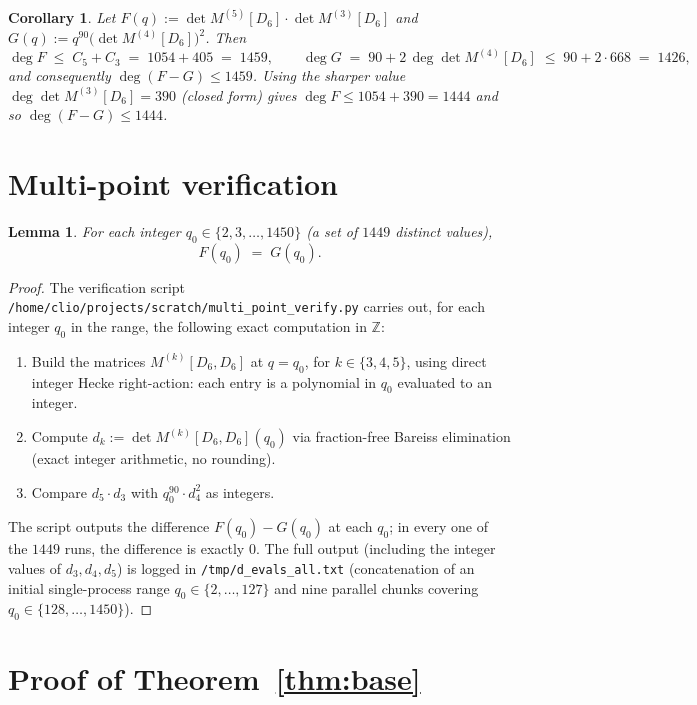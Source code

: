 \documentclass[11pt]{article}
\newtheorem{lemma}[theorem]{Lemma}
\newtheorem{corollary}[theorem]{Corollary}
\theoremstyle{definition}
\begin{document}
\begin{corollary}\label{cor:deg-FG}
Let $F(q):=\det M^{(5)}[D_6]\cdot\det M^{(3)}[D_6]$ and
$G(q):=q^{90}\bigl(\det M^{(4)}[D_6]\bigr)^2$. Then
\[
\deg F \;\leq\; C_5 + C_3 \;=\; 1054 + 405 \;=\; 1459,
\qquad
\deg G \;=\; 90 + 2\,\deg\det M^{(4)}[D_6] \;\leq\; 90 + 2\cdot 668 \;=\; 1426,
\]
and consequently $\deg(F-G)\leq 1459$.
Using the sharper value $\deg\det M^{(3)}[D_6]=390$ (closed form) gives
$\deg F\leq 1054+390=1444$ and so $\deg(F-G)\leq 1444$.
\end{corollary}

\section{Multi-point verification}

\begin{lemma}\label{lem:multi-point}
For each integer $q_0\in\{2,3,\ldots,1450\}$ (a set of $1449$ distinct values),
\[
F(q_0)\;=\;G(q_0).
\]
\end{lemma}

\begin{proof}
The verification script
\texttt{/home/clio/projects/scratch/multi\_point\_verify.py} carries out, for
each integer $q_0$ in the range, the following exact computation in
$\mathbb{Z}$:
\begin{enumerate}
\item Build the matrices $M^{(k)}[D_6, D_6]$ at $q=q_0$, for $k\in\{3,4,5\}$,
using direct integer Hecke right-action: each entry is a polynomial in $q_0$
evaluated to an integer.
\item Compute $d_k:=\det M^{(k)}[D_6, D_6](q_0)$ via fraction-free Bareiss
elimination (exact integer arithmetic, no rounding).
\item Compare $d_5\cdot d_3$ with $q_0^{90}\cdot d_4^2$ as integers.
\end{enumerate}
The script outputs the difference $F(q_0)-G(q_0)$ at each $q_0$; in every one
of the $1449$ runs, the difference is exactly $0$. The full output (including
the integer values of $d_3,d_4,d_5$) is logged in
\texttt{/tmp/d\_evals\_all.txt} (concatenation of an initial single-process
range $q_0\in\{2,\ldots,127\}$ and nine parallel chunks covering
$q_0\in\{128,\ldots,1450\}$).
\end{proof}

\section{Proof of Theorem~\ref{thm:base}}
\end{document}
